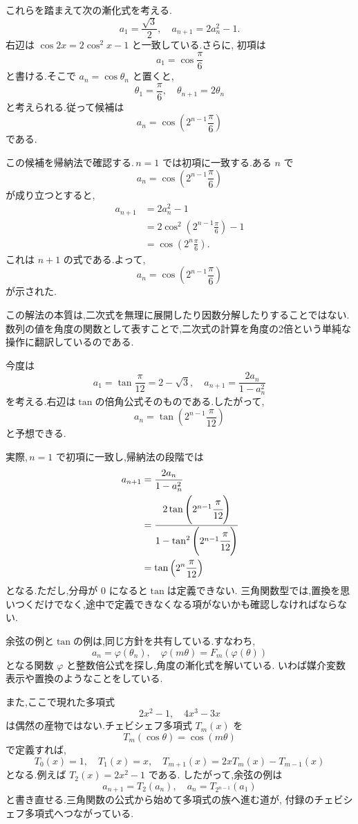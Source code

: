 これらを踏まえて次の漸化式を考える.
\[
  a_1=\frac{\sqrt{3}}{2},\quad a_{n+1}=2a_n^2-1.
\]
右辺は $\cos 2x=2\cos^2x-1$ と一致している.さらに,
初項は
\[
  a_1=\cos\frac{\pi}{6}
\]
と書ける.そこで $a_n=\cos\theta_n$ と置くと,
\[
  \theta_1=\frac{\pi}{6},
  \quad
  \theta_{n+1}=2\theta_n
\]
と考えられる.従って候補は
\[
  a_n=\cos\left(2^{n-1}\frac{\pi}{6}\right)
\]
である.

この候補を帰納法で確認する.\,$n=1$ では初項に一致する.ある $n$ で
\[
  a_n=\cos\left(2^{n-1}\frac{\pi}{6}\right)
\]
が成り立つとすると,
\begin{align*}
  a_{n+1}
    &=2a_n^2-1\\
    &=2\cos^2\left(2^{n-1}\frac{\pi}{6}\right)-1\\
    &=\cos\left(2^n\frac{\pi}{6}\right).
\end{align*}
これは $n+1$ の式である.よって,
\[
  a_n=\cos\left(2^{n-1}\frac{\pi}{6}\right)
\]
が示された.

この解法の本質は,二次式を無理に展開したり因数分解したりすることではない.
数列の値を角度の関数として表すことで,二次式の計算を角度の2倍という単純な操作に翻訳しているのである.

今度は
\[
  a_1=\tan\frac{\pi}{12}=2-\sqrt{3},
  \quad
  a_{n+1}=\frac{2a_n}{1-a_n^2}
\]
を考える.右辺は$\tan$の倍角公式そのものである.したがって,
\[
  a_n=\tan\left(2^{n-1}\frac{\pi}{12}\right)
\]
と予想できる.

実際,\,$n=1$ で初項に一致し,帰納法の段階では
\begin{align*}
  a_{n+1}
    &=\frac{2a_n}{1-a_n^2}\\
    &=\cfrac{2\tan\left(2^{n-1}\cfrac{\pi}{12}\right)}
            {1-\tan^2\left(2^{n-1}\cfrac{\pi}{12}\right)}\\
    &=\tan\left(2^n\frac{\pi}{12}\right)
\end{align*}
となる.ただし,分母が $0$ になると$\tan$は定義できない.
三角関数型では,置換を思いつくだけでなく,途中で定義できなくなる項がないかも確認しなければならない.

余弦の例と$\tan$の例は,同じ方針を共有している.すなわち,
\[
  a_n=\varphi(\theta_n),
  \quad
  \varphi(m\theta)=F_m(\varphi(\theta))
\]
となる関数 $\varphi$ と整数倍公式を探し,角度の漸化式を解いている.
いわば媒介変数表示や置換のようなことをしている.

また,ここで現れた多項式
\[
  2x^2-1,
  \quad
  4x^3-3x
\]
は偶然の産物ではない.チェビシェフ多項式 $T_m(x)$ を
\[
  T_m(\cos\theta)=\cos(m\theta)
\]
で定義すれば,
\[
  T_0(x)=1,
  \quad
  T_1(x)=x,
  \quad
  T_{m+1}(x)=2xT_m(x)-T_{m-1}(x)
\]
となる.例えば $T_2(x)=2x^2-1$ である.
したがって,余弦の例は
\[
  a_{n+1}=T_2(a_n),
  \quad
  a_n=T_{2^{n-1}}(a_1)
\]
と書き直せる.三角関数の公式から始めて多項式の族へ進む道が,
付録のチェビシェフ多項式へつながっている.


